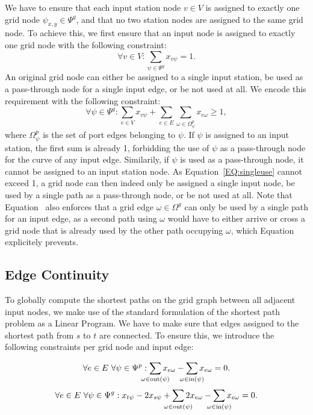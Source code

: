 \documentclass{sig-alternate-sigmod09}
\begin{document}
We have to ensure that each input station node $v \in V$ is assigned to exactly one grid node $\psi_{x, y} \in \Psi^g$, and that no two station nodes are assigned to the same grid node.
To achieve this, we first ensure that an input node is assigned to exactly one grid node with the following constraint:
%
\begin{equation}
  \forall v \in V: \sum_{\psi \in \Psi^g} x_{v\psi} = 1. \label{EQ:todo}
\end{equation}
%
An original grid node can either be assigned to a single input station, be used as a pass-through node for a single input edge, or be not used at all.
We encode this requirement with the following constraint:
%
\begin{equation}
  \forall \psi \in \Psi^g: \sum_{v \in V} x_{v\psi} + \sum_{e \in E} \sum_{\omega \in \Omega^p_\psi} x_{e\omega} \geq 1, \label{EQ:singleuse}
\end{equation}
%
where $\Omega^p_\psi$ is the set of port edges belonging to $\psi$. 
If $\psi$ is assigned to an input station, the first sum is already 1, forbidding the use of $\psi$ as a pass-through node for the curve of any input edge.
Similarily, if $\psi$ is used as a pass-through node, it cannot be assigned to an input station node.
As Equation~\ref{EQ:singleuse} cannot exceed 1, a grid node can then indeed only be assigned a single input node, be used by a single path as a pass-through node, or be not used at all.
Note that Equation~\label{EQ:singleuse} also enforces that a grid edge $\omega \in \Omega^g$ can only be used by a single path for an input edge, as a second path using $\omega$ would have to either arrive or cross a grid node that is already used by the other path occupying $\omega$, which Equation~\label{EQ:singleuse} explicitely prevents.

\subsection{Edge Continuity}

To globally compute the shortest paths on the grid graph between all adjacent input nodes, we make use of the standard formulation of the shortest path problem as a Linear Program.
We have to make sure that edges assigned to the shortest path from $s$ to $t$ are connected.
To ensure this, we introduce the following constraints per grid node and input edge:

\newcommand\Psum[1]{\sum_{\makebox[0pt]{$\scriptstyle#1$}}}

\begin{equation}
  \forall e \in E\ \forall \psi \in \Psi^p: \Psum{\omega \in \text{out}(\psi)} x_{e\omega} - \Psum{\omega \in \text{in}(\psi)} x_{e\omega} = 0. \label{EQ:cont_port}
\end{equation}
\begin{equation}
	\begin{split}
  	\forall e \in E\ \forall \psi \in \Psi^g: x_{t\psi} - 2x_{s\psi} + \Psum{\omega \in \text{out}(\psi)} 2x_{e\omega} - \Psum{\omega \in \text{in}(\psi)} x_{e\omega} = 0. \label{EQ:cont_grid}
  \end{split}
\end{equation}
\end{document}
